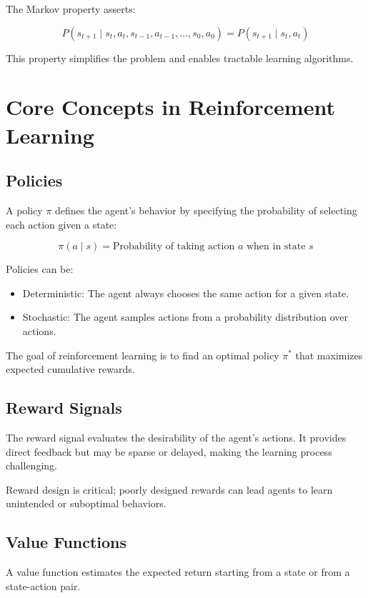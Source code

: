 \documentclass[openany]{book}
\begin{document}
The Markov property asserts:

\[
P(s_{t+1} \mid s_t, a_t, s_{t-1}, a_{t-1}, \dots, s_0, a_0) = P(s_{t+1} 
\mid s_t, a_t)
\]

This property simplifies the problem and enables tractable learning algorithms.

\section{Core Concepts in Reinforcement Learning}

\subsection{Policies}

A policy \( \pi \) defines the agent's behavior by specifying the probability of 
selecting each action given a state:

\[
\pi(a \mid s) = \text{Probability of taking action } a \text{ when in state } s
\]

Policies can be:

\begin{itemize}
    \item Deterministic: The agent always chooses the same action for a given 
    state.
    \item Stochastic: The agent samples actions from a probability distribution 
    over actions.
\end{itemize}

The goal of reinforcement learning is to find an optimal policy \( \pi^* \) that 
maximizes expected cumulative rewards.

\subsection{Reward Signals}

The reward signal evaluates the desirability of the agent's actions. It provides 
direct feedback but may be sparse or delayed, making the learning process 
challenging.

Reward design is critical; poorly designed rewards can lead agents to learn 
unintended or suboptimal behaviors.

\subsection{Value Functions}

A value function estimates the expected return starting from a state or from a 
state-action pair.
\end{document}
